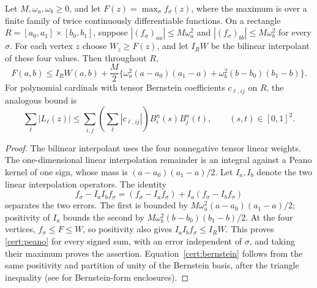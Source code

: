 \begin{lemma}\label{cert:positive}
Let $M,\omega_a,\omega_b\geq0$, and let
$F(z)=\max_{\sigma}f_\sigma(z)$, where the maximum is over a finite
family of twice continuously differentiable functions.
On a rectangle $R=[a_0,a_1]\times[b_0,b_1]$, suppose
$|(f_\sigma)_{aa}|\leq M\omega_a^2$ and
$|(f_\sigma)_{bb}|\leq M\omega_b^2$ for every $\sigma$.
For each vertex $z$ choose $W_z\geq F(z)$, and let $I_RW$ be the
bilinear interpolant of these four values. Then throughout $R$,
\begin{equation}\label{cert:peano}
 F(a,b)\leq I_RW(a,b)+\frac M2\{
 \omega_a^2(a-a_0)(a_1-a)+\omega_b^2(b-b_0)(b_1-b)\}.
\end{equation}
For polynomial cardinals with tensor
Bernstein coefficients $c_{\ell,ij}$ on $R$, the analogous bound is
\begin{equation}\label{cert:bernstein}
 \sum_\ell|L_\ell(z)|\leq
 \sum_{i,j}\left(\sum_\ell|c_{\ell,ij}|\right)B_i^n(s)B_j^n(t),
 \qquad (s,t)\in[0,1]^2.
\end{equation}
\end{lemma}
\begin{proof}
The bilinear interpolant uses the four nonnegative tensor linear weights.
The one-dimensional linear interpolation remainder is an integral against
a Peano kernel of one sign, whose mass is $(a-a_0)(a_1-a)/2$.
Let $I_a,I_b$ denote the two linear interpolation operators. The identity
\[
 f_\sigma-I_aI_bf_\sigma
   =(f_\sigma-I_af_\sigma)+I_a(f_\sigma-I_bf_\sigma)
\]
separates the two errors. The first is bounded by
$M\omega_a^2(a-a_0)(a_1-a)/2$; positivity of $I_a$ bounds the second
by $M\omega_b^2(b-b_0)(b_1-b)/2$. At the four vertices,
$f_\sigma\leq F\leq W$, so positivity also gives
$I_aI_bf_\sigma\leq I_RW$. This proves \eqref{cert:peano} for
every signed sum, with an error independent of $\sigma$, and taking
their maximum proves the assertion.
Equation~\eqref{cert:bernstein} follows from the same positivity and
partition of unity of the Bernstein basis, after the triangle inequality
(see \cite{Lorentz1986} for Bernstein-form enclosures).
\end{proof}

